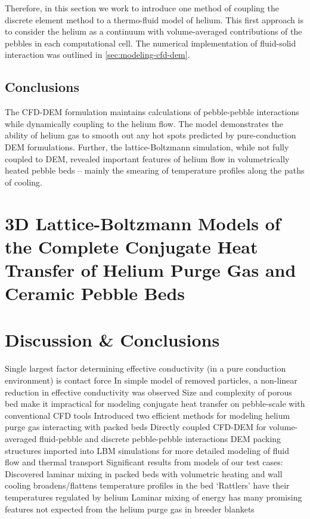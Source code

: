 Therefore, in this section we work to introduce one method of coupling the discrete element method to a thermo-fluid model of helium. This first approach is to consider the helium as a continuum with volume-averaged contributions of the pebbles in each computational cell. The numerical implementation of fluid-solid interaction was outlined in \cref{sec:modeling-cfd-dem}.





\subsection{Conclusions}
The CFD-DEM formulation maintains calculations of pebble-pebble interactions while dynamically coupling to the helium flow. The model demonstrates the ability of helium gas to smooth out any hot spots predicted by pure-conduction DEM formulations. Further, the lattice-Boltzmann simulation, while not fully coupled to DEM, revealed important features of helium flow in volumetrically heated pebble beds – mainly the smearing of temperature profiles along the paths of cooling.










\section{3D Lattice-Boltzmann Models of the Complete Conjugate Heat Transfer of Helium Purge Gas and Ceramic Pebble Beds}\label{sec:lbm-studies}

%

\section{Discussion \& Conclusions}
Single largest factor determining effective conductivity (in a pure conduction environment) is contact force
In simple model of removed particles, a non-linear reduction in effective conductivity was observed
Size and complexity of porous bed make it impractical for modeling conjugate heat transfer on pebble-scale with conventional CFD tools
Introduced two efficient methods for modeling helium purge gas interacting with packed beds
Directly coupled CFD-DEM for volume-averaged fluid-pebble and discrete pebble-pebble interactions
DEM packing structures imported into LBM simulations for more detailed modeling of fluid flow and thermal transport
Significant results from models of our test cases:
Discovered laminar mixing in packed beds with volumetric heating and wall cooling broadens/flattens temperature profiles in the bed 
‘Rattlers’ have their temperatures regulated by helium
Laminar mixing of energy has many promising features not expected from the helium purge gas in breeder blankets